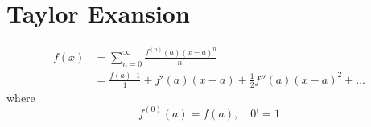 \documentclass[12pt]{article}
\title{}
\author{}
\date{}
\begin{document}
\maketitle
\section{Taylor Exansion}
\begin{align*}
f(x)&= \sum\limits_{n = 0} ^\infty \frac{f^{(n)}(a)(x - a)^{n}}{n!}\\
&= \frac{f(a)\cdot 1}{1} + f'(a)(x - a) + \frac{1}{2}f''(a)(x - a)^{2} + ...
\end{align*}
where
\begin{equation*}
f^{(0)}(a) = f(a), \quad 0! = 1
\end{equation*}
\end{document}
